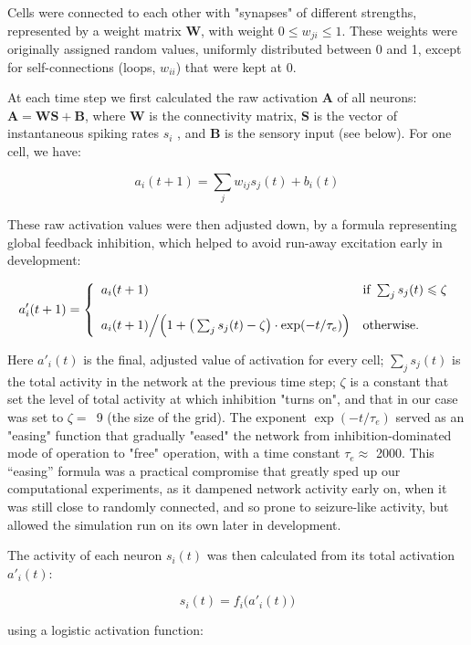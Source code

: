 \documentclass{article}
\begin{document}
Cells were connected to each other with "synapses" of different strengths, represented by a weight matrix $\mathbf{W}$, with weight $0 \leqslant w_{ji} \leqslant 1$. These weights were originally assigned random values, uniformly distributed between 0 and 1, except for self-connections (loops, $w_{ii}$) that were kept at 0.

At each time step we first calculated the raw activation $\mathbf{A}$ of all neurons: $\mathbf{A} = \mathbf{WS} + \mathbf{B}$, where $\mathbf{W}$ is the connectivity matrix, $\mathbf{S}$ is the vector of instantaneous spiking rates $s_i$ , and $\mathbf{B}$ is the sensory input (see below). For one cell, we have:

\[ a_i(t+1) = \sum_j{w_{ij}s_j(t)} + b_i(t) \]

These raw activation values were then adjusted down, by a formula representing global feedback inhibition, which helped to avoid run-away excitation early in development:

\[ a'_i(t+1) = \left \{ \begin{array}{l l} a_i(t+1)
& \text{if } \sum_j{s_j(t)} \leqslant \zeta \\ 
 & \\
a_i(t+1)\Big/ \Big(1 + \big(\sum_j{s_j(t)} - \zeta\big) \cdot \exp(- t/\tau_e)\Big) 
& \text{otherwise.} \end{array} \right. \]

Here $a'_i(t)$ is the final, adjusted value of activation for every cell; $\sum_j{s_j(t)}$ is the total activity in the network at the previous time step; $\zeta$ is a constant that set the level of total activity at which inhibition "turns on", and that in our case was set to \mbox{$\zeta=$ 9} (the size of the grid). The exponent $\exp(-t/\tau_e)$ served as an "easing" function that gradually "eased" the network from inhibition-dominated mode of operation to "free" operation, with a time constant $\tau_e\approx$ 2000. This “easing” formula was a practical compromise that greatly sped up our computational experiments, as it dampened network activity early on, when it was still close to randomly connected, and so prone to seizure-like activity, but allowed the simulation run on its own later in development.

The activity of each neuron $s_i(t)$ was then calculated from its total activation $a'_i(t)$:

\[ s_i(t) = f_i\big(a'_i(t)\big) \]

using a logistic activation function: 
\end{document}
